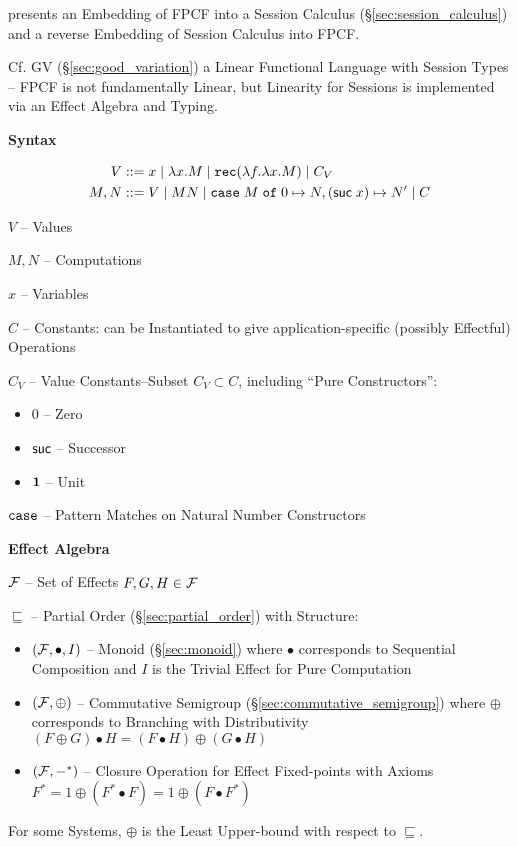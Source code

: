 \fist \cite{orchard-yoshida16} presents an Embedding of FPCF into a
Session Calculus (\S\ref{sec:session_calculus}) and a reverse
Embedding of Session Calculus into FPCF.

\fist Cf. GV (\S\ref{sec:good_variation}) a Linear Functional Language
with Session Types \cite{wadler12} -- FPCF is not fundamentally
Linear, but Linearity for Sessions is implemented via an Effect
Algebra and Typing.

\textbf{Syntax}

\begin{align*}
  V &::= x \mid \lambda x.M \mid \mathtt{rec}(\lambda f.\lambda x.M)
    \mid C_V \\
  M,N &::= V \mid M N \mid \mathtt{case}\; M \;\mathtt{of}\; 0 \mapsto N,
    (\mathsf{suc}\; x) \mapsto N' \mid C
\end{align*}

$V$ -- Values

$M,N$ -- Computations

$x$ -- Variables

$C$ -- Constants: can be Instantiated to give application-specific
(possibly Effectful) Operations %

$C_V$ -- Value Constants--Subset $C_V \subset C$, including
``Pure Constructors'': %
\begin{itemize}
  \item $0$ -- Zero
  \item $\mathsf{suc}$ -- Successor
  \item $\mathbf{1}$ -- Unit
\end{itemize}

$\mathtt{case}$ -- Pattern Matches on Natural Number Constructors


\textbf{Effect Algebra}

$\mathcal{F}$ -- Set of Effects $F,G,H \in \mathcal{F}$

$\sqsubseteq$ -- Partial Order (\S\ref{sec:partial_order}) with
Structure:
\begin{itemize}
  \item $(\mathcal{F},\bullet,I)$ -- Monoid (\S\ref{sec:monoid}) where
    $\bullet$ corresponds to Sequential Composition and $I$ is the
    Trivial Effect for Pure Computation
  \item $(\mathcal{F},\oplus)$ -- Commutative Semigroup
    (\S\ref{sec:commutative_semigroup}) where $\oplus$ corresponds to
    Branching with Distributivity $(F \oplus G) \bullet H = (F \bullet
    H) \oplus (G \bullet H)$
  \item $(\mathcal{F},-^*)$ -- Closure Operation for Effect Fixed-points
    with Axioms $F^* = 1 \oplus (F^* \bullet F) = 1 \oplus (F \bullet
    F^*)$
\end{itemize}
For some Systems, $\oplus$ is the Least Upper-bound with respect to
$\sqsubseteq$. %


